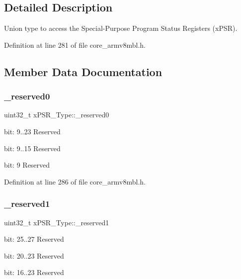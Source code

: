 \begin{DoxyCompactItemize}
\begin{tabbing}
\end{tabbing}\end{DoxyCompactItemize}


\subsection{Detailed Description}
Union type to access the Special-\/\+Purpose Program Status Registers (x\+P\+SR). 

Definition at line 281 of file core\+\_\+armv8mbl.\+h.



\subsection{Member Data Documentation}
\mbox{\label{unionx_p_s_r___type_af438e0f407357e914a70b5bd4d6a97c5}} 
\subsubsection{\texorpdfstring{\+\_\+reserved0}{\_reserved0}}
{\footnotesize\ttfamily uint32\+\_\+t x\+P\+S\+R\+\_\+\+Type\+::\+\_\+reserved0}

bit\+: 9..23 Reserved

bit\+: 9..15 Reserved

bit\+: 9 Reserved 

Definition at line 286 of file core\+\_\+armv8mbl.\+h.

\mbox{\label{unionx_p_s_r___type_a790056bb6f20ea16cecc784b0dd19ad6}} 
\subsubsection{\texorpdfstring{\+\_\+reserved1}{\_reserved1}}
{\footnotesize\ttfamily uint32\+\_\+t x\+P\+S\+R\+\_\+\+Type\+::\+\_\+reserved1}

bit\+: 25..27 Reserved

bit\+: 20..23 Reserved

bit\+: 16..23 Reserved 

